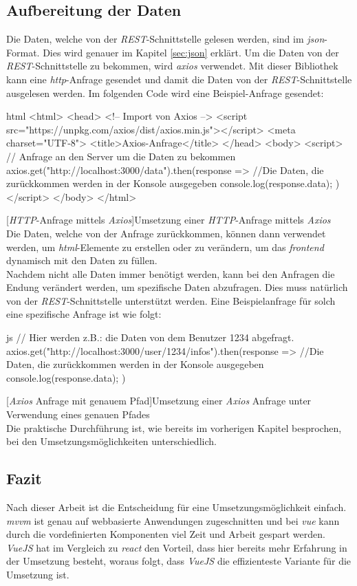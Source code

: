 \subsection{Aufbereitung der Daten}
Die Daten, welche von der \textit{REST}-Schnittstelle gelesen werden, sind im \textit{\Gls{json}}-Format. Dies wird genauer im Kapitel \autoref{sec:json} erklärt. Um die Daten von der \textit{REST}-Schnittstelle zu bekommen, wird \textit{\Gls{axios}} verwendet. Mit dieser Bibliothek kann eine \textit{\Gls{http}}-Anfrage gesendet und damit die Daten von der \textit{REST}-Schnittstelle ausgelesen werden. Im folgenden Code wird eine Beispiel-Anfrage gesendet:
\begin{code}{html}
	<html>
		<head>
			<!-- Import von Axios -->
			<script src="https://unpkg.com/axios/dist/axios.min.js"></script>
			<meta charset="UTF-8">
			<title>Axios-Anfrage</title>
		</head>
		<body>
			<script>
				// Anfrage an den Server um die Daten zu bekommen
				axios.get("http://localhost:3000/data").then(response => {
					//Die Daten, die zurückkommen werden in der Konsole ausgegeben
					console.log(response.data);
				})
			</script>
		</body>
	</html>
\end{code}
[\textit{HTTP}-Anfrage mittels \textit{Axios}]{Umsetzung einer \textit{HTTP}-Anfrage mittels \textit{Axios}}~\\
Die Daten, welche von der Anfrage zurückkommen, können dann verwendet werden, um \textit{\Gls{html}}-Elemente zu erstellen oder zu verändern, um das \textit{\Gls{frontend}} dynamisch mit den Daten zu füllen.\\Nachdem nicht alle Daten immer benötigt werden, kann bei den Anfragen die Endung verändert werden, um spezifische Daten abzufragen. Dies muss natürlich von der \textit{REST}-Schnittstelle unterstützt werden. Eine Beispielanfrage für solch eine spezifische Anfrage ist wie folgt:
\begin{code}{js}
	// Hier werden z.B.: die Daten von dem Benutzer 1234 abgefragt.
	axios.get("http://localhost:3000/user/1234/infos").then(response => {
		//Die Daten, die zurückkommen werden in der Konsole ausgegeben
		console.log(response.data);
	})
\end{code}
[\textit{Axios} Anfrage mit genauem Pfad]{Umsetzung einer \textit{Axios} Anfrage unter Verwendung eines genauen Pfades}~\\
Die praktische Durchführung ist, wie bereits im vorherigen Kapitel besprochen, bei den Umsetzungsmöglichkeiten unterschiedlich.
\subsection{Fazit}
\label{sec:rfoster_fazit}
Nach dieser Arbeit ist die Entscheidung für eine Umsetzungsmöglichkeit einfach. \textit{\Gls{mvvm}} ist genau auf webbasierte Anwendungen zugeschnitten und bei \textit{\Gls{vue}} kann durch die vordefinierten Komponenten viel Zeit und Arbeit gespart werden. \textit{VueJS} hat im Vergleich zu \textit{\Gls{react}} den Vorteil, dass hier bereits mehr Erfahrung in der Umsetzung besteht, woraus folgt, dass \textit{VueJS} die effizienteste Variante für die Umsetzung ist.
